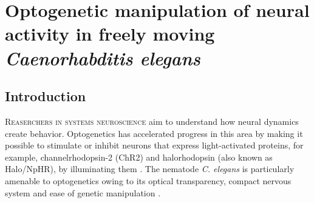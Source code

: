 


\chapter{Optogenetic manipulation of neural activity in freely moving \textit{Caenorhabditis elegans}}\label{chapter:colbert}



\section{Introduction}
\lettrine{R}{easerchers in systems neuroscience} aim to understand how neural dynamics create behavior. Optogenetics has accelerated progress in this area by making it possible to stimulate or inhibit neurons that express light-activated proteins, for example, channelrhodopsin-2 (ChR2) and halorhodopsin (also known as Halo/NpHR), by illuminating them \citep{nagel_channelrhodopsin-2_2003, boyden_millisecond-timescale_2005, zhang_channelrhodopsin-2_2006, han_multiple-color_2007,szobota_remote_2007,zhang_multimodal_2007,chow_high-performance_2010}. 
The nematode \textit{C. elegans} is particularly amenable to optogenetics owing to its optical transparency, compact nervous system and ease of genetic manipulation \citep{nagel_light_2005, liewald_optogenetic_2008, guo_optical_2009,stirman_high-throughput_2010}.

